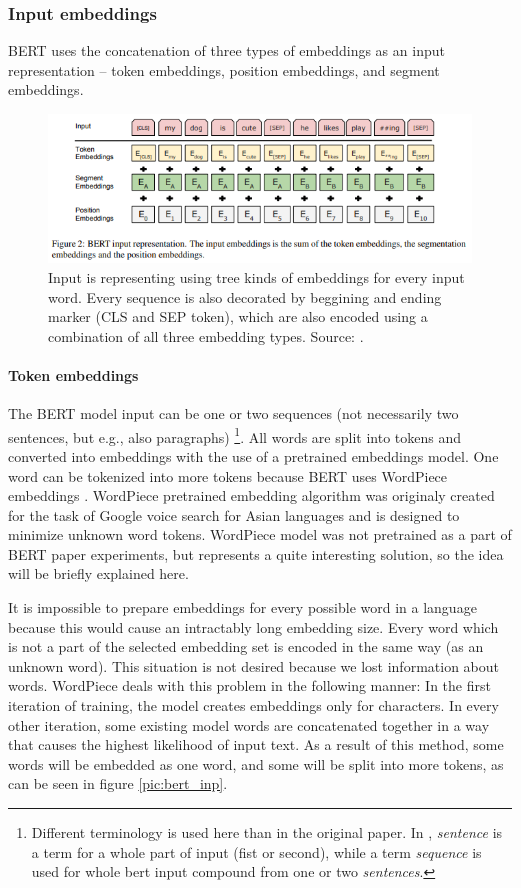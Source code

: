 \subsubsection{Input embeddings}
BERT uses the concatenation of three types of embeddings as an input representation -- token embeddings, position embeddings, and segment embeddings.
\begin{figure}[h]
\centering
\includegraphics[width=1\columnwidth]{../img/bert_embeddings}
\protect\caption{ Input is representing using tree kinds of embeddings for every input word. Every sequence is also decorated by beggining and ending marker (CLS and SEP token), which are also encoded using a combination of all three embedding types.
Source: \textit{\citep{Devlin2019}}.}
\label{pic:bert_emb}
\end{figure}
\paragraph{Token embeddings}
The BERT model input can be one or two sequences (not necessarily two sentences, but e.g., also paragraphs) \footnote{Different terminology is used here than in the original paper. In \citep{Devlin2019}, \textit{sentence} is a term for a whole part of input (fist or second), while a term \textit{sequence} is used for whole bert input compound from one or two \textit{sentences}.}. All words are split into tokens and converted into embeddings with the use of a pretrained embeddings model. One word can be tokenized into more tokens because BERT uses WordPiece
embeddings \citep{Wu2016}. WordPiece pretrained embedding algorithm was originaly created for the task of Google voice search for Asian languages and is designed to minimize unknown word tokens. WordPiece model was not pretrained as a part of BERT paper experiments, but represents a quite interesting solution, so the idea will be briefly explained here.
\par
It is impossible to prepare embeddings for every possible word in a language because this would cause an intractably long embedding size. Every word which is not a part of the selected embedding set is encoded in the same way (as an unknown word). This situation is not desired because we lost information about words. WordPiece deals with this problem in the following manner: In the first iteration of training, the model creates embeddings only for characters. In every other iteration, some existing model words are concatenated together in a way that causes the highest likelihood of input text. As a result of this method, some words will be embedded as one word, and some will be split into more tokens, as can be seen in figure \ref{pic:bert_inp}.

